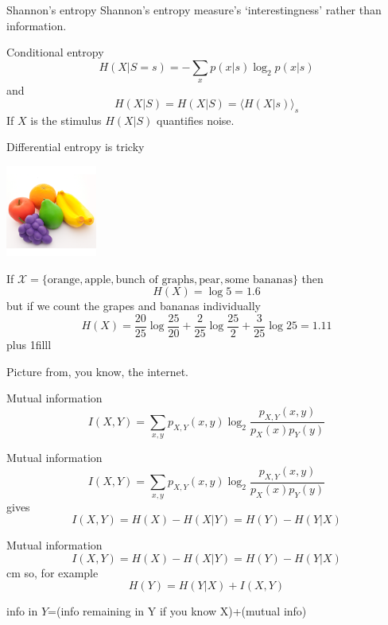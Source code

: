 \documentclass{beamer}
\newcommand{\btVFill}{\vskip0pt plus 1filll}
\begin{document}
\begin{frame}{Shannon's entropy}
  Shannon's entropy measure's \lq{}interestingness\rq{} rather than information.
\end{frame}

\begin{frame}{Conditional entropy}
\color{dark}
  $$
H(X|S=s)=-\sum_x p(x|s)\log_2{p(x|s)}
$$
\color{black}
and
\color{dark}
$$
H(X|S)=H(X|S)=\langle H(X|s)\rangle_s
$$
\color{black}
If $X$ is the stimulus $H(X|S)$ quantifies noise.
\end{frame}

\begin{frame}{Differential entropy is tricky}
  \begin{center}
    \includegraphics[width=3cm]{lanco_fruits_1.png}
  \end{center}
  If $\mathcal{X}=\{\mbox{orange},\mbox{apple},\mbox{bunch of graphs},\mbox{pear},\mbox{some bananas}\}$ then
\color{dark}
  $$H(X)=\log{5}=1.6$$
\color{black}
but if we count the grapes and bananas individually
\color{dark}
  $$H(X)=\frac{20}{25}\log{\frac{25}{20}}+\frac{2}{25}\log\frac{25}{2}+\frac{3}{25}\log{25}=1.11$$
\color{black}
\btVFill
\color{gray}
\begin{flushright}
\tiny{Picture from, you know, the internet.}
\end{flushright}
\end{frame}

\begin{frame}{Mutual information}
\color{dark}
$$
I(X,Y)=\sum_{x,y} p_{X,Y}(x,y) \log_2{\frac{p_{X,Y}(x,y)}{p_X(x)p_Y(y)}}
$$
\color{black}
\end{frame}


\begin{frame}{Mutual information}
\color{dark}
$$
I(X,Y)=\sum_{x,y} p_{X,Y}(x,y) \log_2{\frac{p_{X,Y}(x,y)}{p_X(x)p_Y(y)}}
$$
\color{black}
gives
\color{dark}
$$
I(X,Y)=H(X)-H(X|Y)=H(Y)-H(Y|X)
$$
\color{black}
\end{frame}


\begin{frame}{Mutual information}
\color{dark}
$$
I(X,Y)=H(X)-H(X|Y)=H(Y)-H(Y|X)
$$
\color{black}
 cm
so, for example
\color{dark}
$$
H(Y)=H(Y|X)+I(X,Y)
$$
\color{black}
\begin{center}
info in $Y$=(info remaining in Y if you know X)+(mutual info)
\end{center}
\end{frame}
\end{document}
